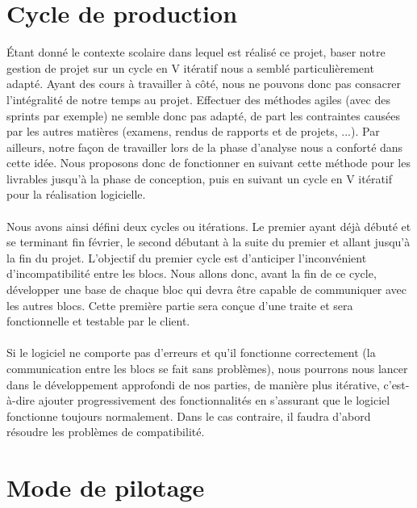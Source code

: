 \section{Cycle de production}

Étant donné le contexte scolaire dans lequel est réalisé ce projet, baser notre gestion de projet sur un cycle en V itératif nous a semblé particulièrement adapté. Ayant des cours à travailler à côté, nous ne pouvons donc pas consacrer l’intégralité de notre temps au projet. Effectuer des méthodes agiles (avec des sprints par exemple) ne semble donc pas adapté, de part les contraintes causées par les autres matières (examens, rendus de rapports et de projets, ...). Par ailleurs, notre
façon de travailler lors de la phase d’analyse nous a conforté dans cette idée. Nous proposons donc de fonctionner en suivant cette méthode pour les livrables jusqu’à la phase de conception, puis en suivant un cycle en V itératif pour la réalisation logicielle. 

\paragraph{}

Nous avons ainsi défini deux cycles ou itérations. Le premier ayant déjà débuté et se terminant fin février, le second débutant à la suite du premier et allant jusqu’à la fin du projet. L’objectif du premier cycle est d’anticiper l’inconvénient d’incompatibilité entre les blocs. Nous allons donc, avant la fin de ce cycle, développer une base de chaque bloc qui devra être capable de communiquer avec les autres blocs. Cette première partie sera conçue d’une traite et sera fonctionnelle et testable par le client.

\newpage

\paragraph{}

Si le logiciel ne comporte pas d’erreurs et qu’il fonctionne correctement (la communication entre les blocs se fait sans problèmes), nous pourrons nous lancer dans le développement approfondi de nos parties, de manière plus itérative, c’est-à-dire ajouter progressivement des fonctionnalités en s’assurant que le logiciel fonctionne toujours normalement. Dans le cas contraire, il faudra d’abord résoudre les problèmes de compatibilité.

\section{Mode de pilotage}

